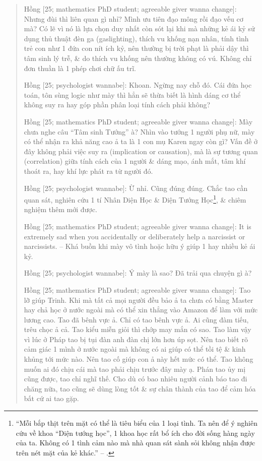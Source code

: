\documentclass[12pt,oneside]{book}
\begin{document}
\begin{quote}
	{\sf Hồng [25; mathematics PhD student; agreeable giver wanna change]}: Nhưng đùi thì liên quan gì nhỉ? Mình ưu tiên đạo mông rồi đạo vếu cơ mà? Có lẽ vì nó là lựa chọn duy nhất còn sót lại khi mà những kẻ ái kỷ sử dụng thủ thuật đèn ga (gaslighting), thích vu khống nạn nhân, tính tình trẻ con như 1 đứa con nít ích kỷ, nên thường bị trời phạt là phải dậy thì tâm sinh lý trễ, \& do thích vu khống nên thường không có vú. Không chỉ đơn thuần là 1 phép chơi chữ ấu trĩ.
	
	{\sf Hồng [25; psychologist wannabe]}: Khoan. Ngừng nay chỗ đó. Cái đứa học toán, tôn sùng logic như mày thì hẳn sẽ thừa biết là hình dáng cơ thể không suy ra hay góp phần phân loại tính cách phải không?
	
	{\sf Hồng [25; mathematics PhD student; agreeable giver wanna change]}: Mày chưa nghe câu ``Tâm sinh Tướng'' à? Nhìn vào tướng 1 người phụ nữ, mày có thể nhận ra khả năng cao ả ta là 1 con mụ Karen ngay còn gì? Vấn đề ở đây không phải việc suy ra (implication or causation), mà là sự tương quan (correlation) giữa tính cách của 1 người \& dáng mạo, ánh mắt, tâm khí thoát ra, hay khí lực phát ra từ người đó.
	
	{\sf Hồng [25; psychologist wannabe]}: Ừ nhỉ. Cũng đúng đúng. Chắc tao cần quan sát, nghiên cứu 1 tí Nhân Diện Học \& Diện Tướng Học\footnote{``Mỗi bắp thịt trên mặt có thể là tiêu biểu của 1 loại tình. Ta nên để ý nghiên cứu về khoa ``Diện tướng học'', 1 khoa học rất bổ ích cho đời sống hàng ngày của ta. Không có 1 tình cảm nào mà nhà quan sát sành sỏi không nhận được trên nét mặt của kẻ khác.'' -- \cite[Chap. 1: {\it Thuật Quan Sát}, p. 39]{Can_oc_sang_suot}.}, \& chiêm nghiệm thêm mới được.
	
	{\sf Hồng [25; mathematics PhD student; agreeable giver wanna change]}: It is extremely sad when you accidentally or deliberately help a narcissist or narcissists. -- Khá buồn khi mày vô tình hoặc hữu ý giúp 1 hay nhiều kẻ ái kỷ.
	
	{\sf Hồng [25; psychologist wannabe]}: Ý mày là sao? Đã trải qua chuyện gì à?
	
	{\sf Hồng [25; mathematics PhD student; agreeable giver wanna change]}: Tao lỡ giúp Trinh. Khi mà tất cả mọi người đều bảo ả ta chưa có bằng Master hay chả học ở nước ngoài mà có thể xin thẳng vào Amazon để làm với mức lương cao. Tao đã bênh vực ả. Chỉ có tao bênh vực ả. Ai cũng đàm tiếu, trêu chọc ả cả. Tao kiểu miễn giỏi thì chớp may mắn có sao. Tao làm vậy vì lúc ở Pháp tao bị tụi đàn anh đàn chị lớn hơn úp sọt. Nên tao biết rõ cảm giác 1 mình ở nước ngoài mà không có ai giúp có thể tồi tệ \& kinh khủng tới mức nào. Nên tao cố giúp con ả này hết mức có  thể. Tao không muốn ai đó chịu cái mà tao phải chịu trước đây mày ạ. Phán tao ủy mị cũng được, tao chỉ nghĩ thế. Cho dù có bao nhiêu người cảnh báo tao đi chăng nữa, tao cũng sẽ dùng lòng tốt \& sự chân thành của tao để cảm hóa bất cứ ai tao gặp.
	

\end{quote}
\end{document}
